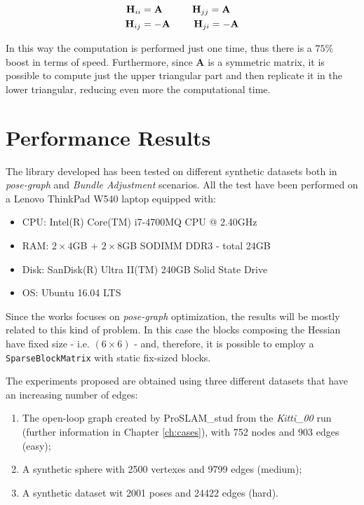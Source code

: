 \begin{align*}
    \mathbf{H}_{ii} &= \mathbf{A} \quad\qquad
    \mathbf{H}_{jj} = \mathbf{A} \\
    \mathbf{H}_{ij} &= -\mathbf{A} \:\,\qquad
    \mathbf{H}_{ji} = -\mathbf{A}
\end{align*}

\noindent In this way the computation is performed just one time, thus there is a $75\%$ boost in terms of speed. Furthermore, since $\mathbf{A}$ is a symmetric matrix, it is possible to compute just the upper triangular part and then replicate it in the lower triangular, reducing even more the computational time.

\section{Performance Results}\label{sec:performance_results}
The library developed has been tested on different synthetic datasets both in \textit{pose-graph} and \textit{Bundle Adjustment} scenarios. All the test have been performed on a Lenovo ThinkPad W540 laptop equipped with:

\begin{itemize}
    \item CPU: Intel(R) Core(TM) i7-4700MQ CPU @ 2.40GHz
    \item RAM: $2 \times 4$GB $+$ $2\times8$GB SODIMM DDR3 - total 24GB
    \item Disk: SanDisk(R) Ultra II(TM) 240GB Solid State Drive
    \item OS: Ubuntu 16.04 LTS
\end{itemize}

Since the works focuses on \textit{pose-graph} optimization, the results will be mostly related to this kind of problem. In this case the blocks composing the Hessian have fixed size - i.e. $(6\times6)$ - and, therefore, it is possible to employ a \texttt{SparseBlockMatrix} with static fix-sized blocks. 

The experiments proposed are obtained using three different datasets that have an increasing number of edges:

\begin{enumerate}
    \item The open-loop graph created by ProSLAM\_stud from the \textit{Kitti\_00} run (further information in Chapter \ref{ch:cases}), with 752 nodes and 903 edges (easy);
    \item A synthetic sphere with 2500 vertexes and 9799 edges (medium);
    \item A synthetic dataset wit 2001 poses and 24422 edges (hard).
\end{enumerate}

